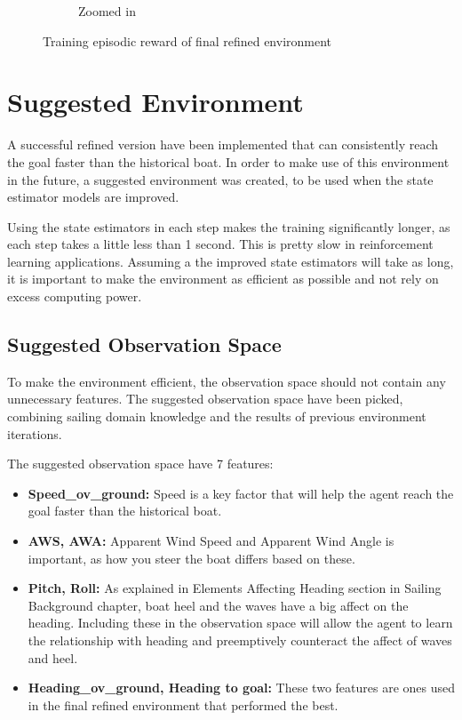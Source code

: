 \documentclass[12pt,twoside]{report}
\begin{document}
\begin{figure}[h]
\begin{subfigure}[b]{0.48\textwidth}
        \caption{Zoomed in}
    \end{subfigure}
    \caption{Training episodic reward of final refined environment}
    \label{fig:modelless-v4}
\end{figure}

\section{Suggested Environment}
A successful refined version have been implemented that can consistently reach the goal faster than the historical boat. In order to make use of this environment in the future, a suggested environment was created, to be used when the state estimator models are improved.

Using the state estimators in each step makes the training significantly longer, as each step takes a little less than 1 second. This is pretty slow in reinforcement learning applications. Assuming a the improved state estimators will take as long, it is important to make the environment as efficient as possible and not rely on excess computing power.

\subsection{Suggested Observation Space}
To make the environment efficient, the observation space should not contain any unnecessary features. The suggested observation space have been picked, combining sailing domain knowledge and the results of previous environment iterations.

The suggested observation space have 7 features:
\begin{itemize}
    \item \textbf{Speed\_ov\_ground:} Speed is a key factor that will help the agent reach the goal faster than the historical boat.
    \item \textbf{AWS, AWA:} Apparent Wind Speed and Apparent Wind Angle is important, as how you steer the boat differs based on these.
    \item \textbf{Pitch, Roll:} As explained in Elements Affecting Heading section in Sailing Background chapter, boat heel and the waves have a big affect on the heading. Including these in the observation space will allow the agent to learn the relationship with heading and preemptively counteract the affect of waves and heel.
    \item \textbf{Heading\_ov\_ground, Heading to goal:} These two features are ones used in the final refined environment that performed the best.
\end{itemize}
\end{document}
